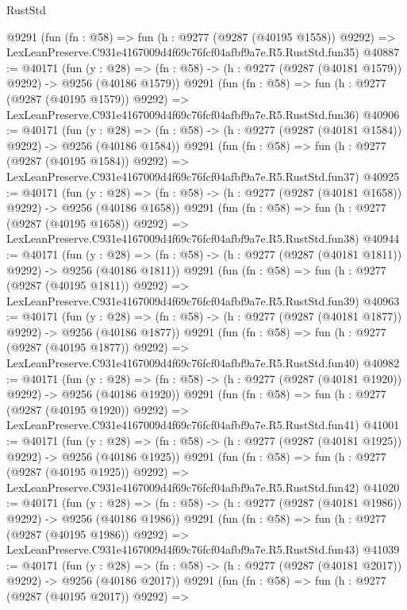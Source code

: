 \begin{lexlean}{RustStd}
\begin{coremodule}
    @9291
    (fun (fn : @58) =>
    fun (h : @9277 (@9287 (@40195 @1558)) @9292) =>
    LexLeanPreserve.C931e4167009d4f69c76fcf04afbf9a7e.R5.RustStd.fun35)
@40887 := @40171
    (fun (y : @28) =>
    (fn : @58) -> (h : @9277 (@9287 (@40181 @1579)) @9292) -> @9256 (@40186 @1579))
    @9291
    (fun (fn : @58) =>
    fun (h : @9277 (@9287 (@40195 @1579)) @9292) =>
    LexLeanPreserve.C931e4167009d4f69c76fcf04afbf9a7e.R5.RustStd.fun36)
@40906 := @40171
    (fun (y : @28) =>
    (fn : @58) -> (h : @9277 (@9287 (@40181 @1584)) @9292) -> @9256 (@40186 @1584))
    @9291
    (fun (fn : @58) =>
    fun (h : @9277 (@9287 (@40195 @1584)) @9292) =>
    LexLeanPreserve.C931e4167009d4f69c76fcf04afbf9a7e.R5.RustStd.fun37)
@40925 := @40171
    (fun (y : @28) =>
    (fn : @58) -> (h : @9277 (@9287 (@40181 @1658)) @9292) -> @9256 (@40186 @1658))
    @9291
    (fun (fn : @58) =>
    fun (h : @9277 (@9287 (@40195 @1658)) @9292) =>
    LexLeanPreserve.C931e4167009d4f69c76fcf04afbf9a7e.R5.RustStd.fun38)
@40944 := @40171
    (fun (y : @28) =>
    (fn : @58) -> (h : @9277 (@9287 (@40181 @1811)) @9292) -> @9256 (@40186 @1811))
    @9291
    (fun (fn : @58) =>
    fun (h : @9277 (@9287 (@40195 @1811)) @9292) =>
    LexLeanPreserve.C931e4167009d4f69c76fcf04afbf9a7e.R5.RustStd.fun39)
@40963 := @40171
    (fun (y : @28) =>
    (fn : @58) -> (h : @9277 (@9287 (@40181 @1877)) @9292) -> @9256 (@40186 @1877))
    @9291
    (fun (fn : @58) =>
    fun (h : @9277 (@9287 (@40195 @1877)) @9292) =>
    LexLeanPreserve.C931e4167009d4f69c76fcf04afbf9a7e.R5.RustStd.fun40)
@40982 := @40171
    (fun (y : @28) =>
    (fn : @58) -> (h : @9277 (@9287 (@40181 @1920)) @9292) -> @9256 (@40186 @1920))
    @9291
    (fun (fn : @58) =>
    fun (h : @9277 (@9287 (@40195 @1920)) @9292) =>
    LexLeanPreserve.C931e4167009d4f69c76fcf04afbf9a7e.R5.RustStd.fun41)
@41001 := @40171
    (fun (y : @28) =>
    (fn : @58) -> (h : @9277 (@9287 (@40181 @1925)) @9292) -> @9256 (@40186 @1925))
    @9291
    (fun (fn : @58) =>
    fun (h : @9277 (@9287 (@40195 @1925)) @9292) =>
    LexLeanPreserve.C931e4167009d4f69c76fcf04afbf9a7e.R5.RustStd.fun42)
@41020 := @40171
    (fun (y : @28) =>
    (fn : @58) -> (h : @9277 (@9287 (@40181 @1986)) @9292) -> @9256 (@40186 @1986))
    @9291
    (fun (fn : @58) =>
    fun (h : @9277 (@9287 (@40195 @1986)) @9292) =>
    LexLeanPreserve.C931e4167009d4f69c76fcf04afbf9a7e.R5.RustStd.fun43)
@41039 := @40171
    (fun (y : @28) =>
    (fn : @58) -> (h : @9277 (@9287 (@40181 @2017)) @9292) -> @9256 (@40186 @2017))
    @9291
    (fun (fn : @58) =>
    fun (h : @9277 (@9287 (@40195 @2017)) @9292) =>

\end{coremodule}
\end{lexlean}
